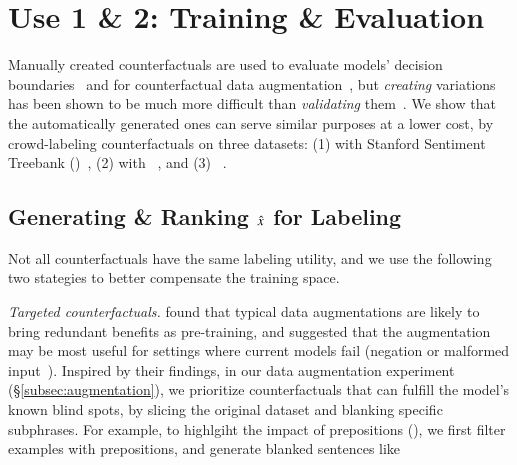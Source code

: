 \section{Use 1 \& 2: Training \& Evaluation}
\label{sec:app_label}

Manually created counterfactuals are used to evaluate models' decision boundaries~\cite{gardner2020contrast} and for counterfactual data augmentation~\cite{kaushik2019learning}, but \emph{creating} variations has been shown to be much more difficult than \emph{validating} them~\cite{ribeiro2018sear}.
We show that the automatically generated ones can serve similar purposes at a lower cost, by crowd-labeling counterfactuals on three datasets: 
(1) \sst with Stanford Sentiment Treebank (\dsst)~\cite{socher2013recursive},
(2) \nli with \dnli~\cite{bowman-etal-2015-large}, and 
(3) \dqqp~\cite{wang2018glue}.

\subsection{Generating \& Ranking $\hat{x}$ for Labeling}
\label{subsec:gen_counterfactual_for_labeling}

Not all counterfactuals have the same labeling utility, and we use the following two stategies to better compensate the training space.

\emph{Targeted counterfactuals.}
\citet{longpre2020effective} found that typical data augmentations are likely to bring redundant benefits as pre-training, and suggested that the augmentation may be most useful for settings where current models fail (\eg negation or malformed input~\cite{rogers2020primer,ettinger2020bert}).
Inspired by their findings, in our data augmentation experiment (\S\ref{subsec:augmentation}), we prioritize counterfactuals that can fulfill the model's known blind spots, by slicing the original dataset and blanking specific subphrases.  
For example, to highlgiht the impact of prepositions (\eg {}), we first filter examples with prepositions, and generate blanked sentences like 

